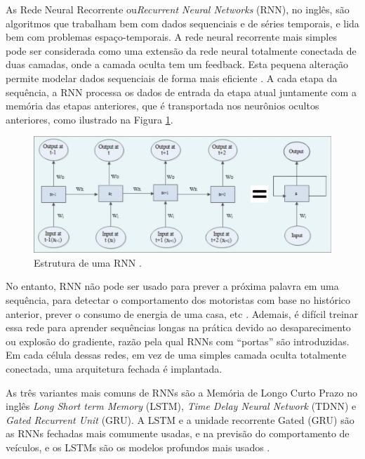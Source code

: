  \label{rnn}

As Rede Neural Recorrente ou\textit{Recurrent Neural Networks} (RNN), no inglês,  são algoritmos que trabalham bem com dados sequenciais e de séries temporais, e lida bem com problemas espaço-temporais. A rede neural recorrente mais simples pode ser considerada como uma extensão da rede neural totalmente conectada de duas camadas, onde a camada oculta tem um feedback. Esta pequena alteração permite modelar dados sequenciais de forma mais eficiente \cite{software-cnn}. A cada etapa da sequência, a RNN processa os dados de entrada da etapa atual juntamente com a memória das etapas anteriores, que é transportada nos neurônios ocultos anteriores, como ilustrado na Figura \ref{RNN}.

\begin{figure}[H]
\centering
\includegraphics[width=\textwidth]{Figures/RNN.png}
\caption{Estrutura de uma RNN \cite{software-cnn}.}
\label{RNN}
\end{figure}

No entanto, RNN não pode ser usado para prever a próxima palavra em uma sequência, para detectar o comportamento dos motoristas com base no histórico anterior, prever o consumo de energia de uma casa, etc \cite{software-cnn}. Ademais, é difícil treinar essa rede para aprender sequências longas na prática devido ao desaparecimento ou explosão do gradiente, razão pela qual RNNs com “portas” são introduzidas. Em cada célula dessas redes, em vez de uma simples camada oculta totalmente conectada, uma arquitetura fechada é implantada. 

As três variantes mais comuns de RNNs são a Memória de Longo Curto Prazo no inglês \textit{Long Short term Memory} (LSTM), \textit{Time Delay Neural Network} (TDNN) e \textit{Gated Recurrent Unit} (GRU).
A LSTM e a unidade recorrente Gated (GRU) são as RNNs fechadas mais comumente usadas, e na previsão do comportamento de veículos, e os LSTMs são os modelos profundos mais usados \cite{software-review}.


